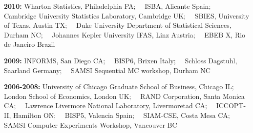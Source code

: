 \documentclass[margin,line]{res}
\begin{document}
\begin{resume}
{\bf 2010:} Wharton Statistics, Philadelphia PA;~~ ISBA, Alicante Spain;~~ Cambridge University Statistics Laboratory, Cambridge UK;~~ SBIES, University of Texas, Austin TX;~~ Duke University Department of Statistical Sciences, Durham NC;~~ Johannes Kepler University IFAS, Linz Austria;~~ EBEB X, Rio de Janeiro Brazil

{\bf 2009:} INFORMS, San Diego CA;~~ BISP6, Brixen Italy;~~ Schloss Dagstuhl, Saarland Germany;~~ SAMSI Sequential MC workshop, Durham NC


{\bf 2006-2008:} University of Chicago Graduate School of Business, Chicago IL;~~ London School of Economics, London UK;~~ RAND Corporation, Santa Monica CA;~~ Lawrence Livermore National Laboratory, Livermoretad CA;~~ ICCOPT-II, Hamilton ON;~~ BISP5, Valencia Spain;~~ SIAM-CSE, Costa Mesa CA;~~ SAMSI Computer Experiments Workshop, Vancouver BC




\end{resume}
\end{document}
